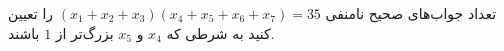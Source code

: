 \EXERCISE
تعداد جواب‌های صحیح نامنفی
$(x_1 + x_2+ x_3)(x_4 + x_5 + x_6 + x_7) = 35$
را تعیین کنید به شرطی که
$x_4$
و
$x_5$
بزرگ‌تر از
$1$
باشند.